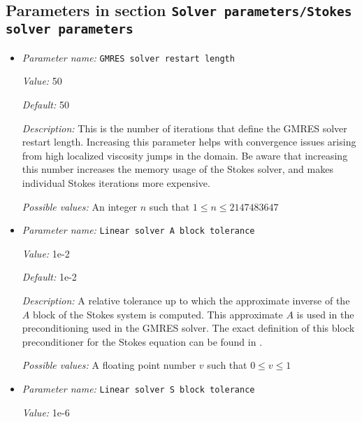 \subsection{Parameters in section \tt Solver parameters/Stokes solver parameters}
\label{parameters:Solver_20parameters/Stokes_20solver_20parameters}

\begin{itemize}
\item {\it Parameter name:} {\tt GMRES solver restart length}
\label{parameters:Solver parameters/Stokes solver parameters/GMRES solver restart length}


{\it Value:} 50


{\it Default:} 50


{\it Description:} This is the number of iterations that define the GMRES solver restart length. Increasing this parameter helps with convergence issues arising from high localized viscosity jumps in the domain. Be aware that increasing this number increases the memory usage of the Stokes solver, and makes individual Stokes iterations more expensive.


{\it Possible values:} An integer $n$ such that $1\leq n \leq 2147483647$
\item {\it Parameter name:} {\tt Linear solver A block tolerance}
\label{parameters:Solver parameters/Stokes solver parameters/Linear solver A block tolerance}


{\it Value:} 1e-2


{\it Default:} 1e-2


{\it Description:} A relative tolerance up to which the approximate inverse of the $A$ block of the Stokes system is computed. This approximate $A$ is used in the preconditioning used in the GMRES solver. The exact definition of this block preconditioner for the Stokes equation can be found in \cite{KHB12}.


{\it Possible values:} A floating point number $v$ such that $0 \leq v \leq 1$
\item {\it Parameter name:} {\tt Linear solver S block tolerance}
\label{parameters:Solver parameters/Stokes solver parameters/Linear solver S block tolerance}


{\it Value:} 1e-6



\end{itemize}
